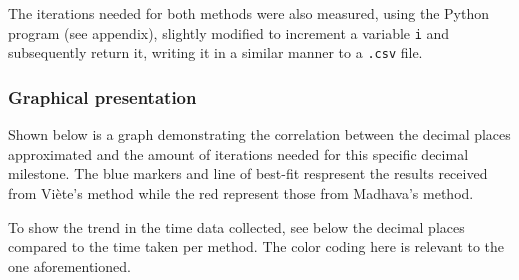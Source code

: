 The iterations needed for both methods were also measured, using the Python program 
(see appendix), slightly modified to increment a variable \verb|i| and subsequently 
return it, writing it in a similar manner to a \verb|.csv| file. 



\subsubsection{Graphical presentation}

Shown below is a graph demonstrating the correlation between the decimal places approximated 
and the amount of iterations needed for this specific decimal milestone. The blue markers and 
line of best-fit respresent the results received from Viète's method while the red represent those 
from Madhava's method. \\


To show the trend in the time data collected, see below the decimal places compared 
to the time taken per method. The color coding here is relevant to the one aforementioned. \\

